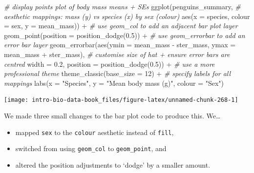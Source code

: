 \documentclass[
]{book}
\newenvironment{Shaded}{\begin{snugshade}}{\end{snugshade}}
\newcommand{\AttributeTok}[1]{\textcolor[rgb]{0.77,0.63,0.00}{#1}}
\newcommand{\CommentTok}[1]{\textcolor[rgb]{0.56,0.35,0.01}{\textit{#1}}}
\newcommand{\DecValTok}[1]{\textcolor[rgb]{0.00,0.00,0.81}{#1}}
\newcommand{\FloatTok}[1]{\textcolor[rgb]{0.00,0.00,0.81}{#1}}
\newcommand{\FunctionTok}[1]{\textcolor[rgb]{0.00,0.00,0.00}{#1}}
\newcommand{\NormalTok}[1]{#1}
\newcommand{\SpecialCharTok}[1]{\textcolor[rgb]{0.00,0.00,0.00}{#1}}
\newcommand{\StringTok}[1]{\textcolor[rgb]{0.31,0.60,0.02}{#1}}
\providecommand{\tightlist}{%
  \setlength{\itemsep}{0pt}\setlength{\parskip}{0pt}}
\begin{document}
\begin{Shaded}
\begin{Highlighting}[]
\CommentTok{\# display points plot of body mass means + SE\textquotesingle{}s}
\FunctionTok{ggplot}\NormalTok{(penguins\_summary, }
       \CommentTok{\# aesthetic mappings: mass (y) vs species (x) by sex (colour)}
       \FunctionTok{aes}\NormalTok{(}\AttributeTok{x =}\NormalTok{ species, }\AttributeTok{colour =}\NormalTok{ sex, }\AttributeTok{y =}\NormalTok{ mean\_mass)) }\SpecialCharTok{+} 
  \CommentTok{\# use geom\_col to add an adjacent bar plot layer}
  \FunctionTok{geom\_point}\NormalTok{(}\AttributeTok{position =} \FunctionTok{position\_dodge}\NormalTok{(}\FloatTok{0.5}\NormalTok{)) }\SpecialCharTok{+}
  \CommentTok{\# use geom\_errorbar to add an error bar layer}
  \FunctionTok{geom\_errorbar}\NormalTok{(}\FunctionTok{aes}\NormalTok{(}\AttributeTok{ymin =}\NormalTok{ mean\_mass }\SpecialCharTok{{-}}\NormalTok{ ster\_mass, }\AttributeTok{ymax =}\NormalTok{ mean\_mass }\SpecialCharTok{+}\NormalTok{ ster\_mass),}
                \CommentTok{\# customise size of hat + ensure error bars are centred}
                \AttributeTok{width =} \FloatTok{0.2}\NormalTok{, }\AttributeTok{position =} \FunctionTok{position\_dodge}\NormalTok{(}\FloatTok{0.5}\NormalTok{)) }\SpecialCharTok{+} 
  \CommentTok{\# use a more professional theme }
  \FunctionTok{theme\_classic}\NormalTok{(}\AttributeTok{base\_size =} \DecValTok{12}\NormalTok{) }\SpecialCharTok{+} 
  \CommentTok{\# specify labels for all mappings}
  \FunctionTok{labs}\NormalTok{(}\AttributeTok{x =} \StringTok{"Species"}\NormalTok{, }\AttributeTok{y =} \StringTok{"Mean body mass (g)"}\NormalTok{, }\AttributeTok{colour =} \StringTok{"Sex"}\NormalTok{)}
\end{Highlighting}
\end{Shaded}

\begin{center}\texttt{[image: intro-bio-data-book\_files/figure-latex/unnamed-chunk-268-1]} \end{center}

We made three small changes to the bar plot code to produce this. We\ldots{}

\begin{itemize}
\tightlist
\item
  mapped \texttt{sex} to the \texttt{colour} aesthetic instead of \texttt{fill},
\item
  switched from using \texttt{geom\_col} to \texttt{geom\_point}, and
\item
  altered the position adjustments to `dodge' by a smaller amount.
\end{itemize}
\end{document}
